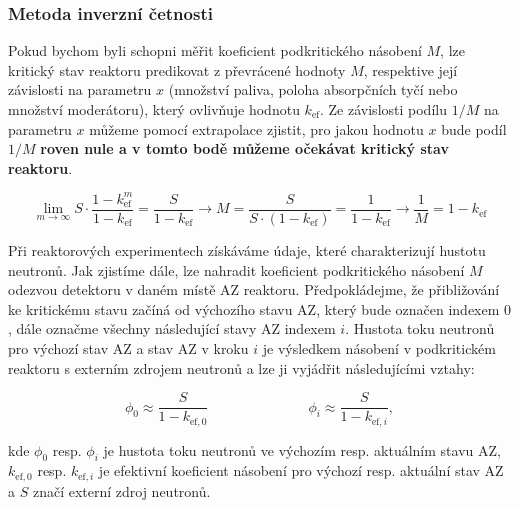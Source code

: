 
\subsubsection{Metoda inverzní četnosti}

Pokud bychom byli schopni měřit koeficient podkritického násobení $M$, lze kritický stav reaktoru predikovat z převrácené hodnoty $M$, respektive její závislosti na parametru $x$ (množství paliva, poloha absorpčních tyčí nebo množství moderátoru), který ovlivňuje hodnotu $k_\text{ef}$. Ze závislosti podílu $1/M$ na parametru $x$ můžeme pomocí extrapolace zjistit, pro jakou hodnotu $x$ bude podíl $1/M$ \textbf{roven nule a v tomto bodě můžeme očekávat kritický stav reaktoru}.

\begin{equation*}
    \lim_{m \to \infty} S \cdot \frac{1 - k_\text{ef}^m}{1 - k_\text{ef}} = \frac{S}{1 - k_\text{ef}} \rightarrow M = \frac{S}{S \cdot (1 - k_\text{ef})} = \frac{1}{1 - k_\text{ef}} \rightarrow \frac{1}{M} = 1 - k_\text{ef}
\end{equation*}

Při reaktorových experimentech získáváme údaje, které charakterizují hustotu neutronů. Jak zjistíme dále, lze nahradit koeficient podkritického násobení $M$ odezvou detektoru v daném místě AZ reaktoru. Předpokládejme, že přibližování ke kritickému stavu začíná od výchozího stavu AZ, který bude označen indexem $0$, dále označme všechny následující stavy AZ indexem $i$. Hustota toku neutronů pro výchozí stav AZ a stav AZ v kroku $i$ je výsledkem násobení v podkritickém reaktoru s externím zdrojem neutronů a lze ji vyjádřit následujícími vztahy:

\begin{equation*}
    \phi_0 \approx \frac{S}{1-k_{\text{ef},0}} \hspace{3cm}\phi_i \approx \frac{S}{1-k_{\text{ef},i}},
\end{equation*}

kde $\phi_0$ resp. $\phi_i$ je hustota toku neutronů ve výchozím resp. aktuálním stavu AZ, $k_{\text{ef},0}$ resp. $k_{\text{ef},i}$ je efektivní koeficient násobení pro výchozí resp. aktuální stav AZ a $S$ značí externí zdroj neutronů.

